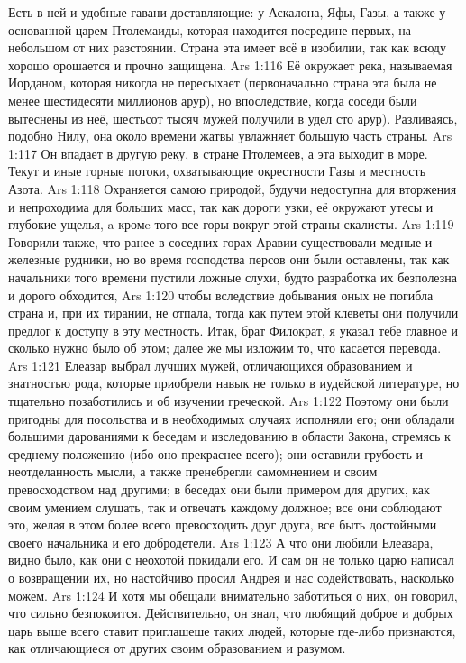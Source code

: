 Есть в ней и удобные гавани доставляющие: у Аскалона, Яфы, Газы, а также у основанной царем Птолемаиды, которая находится посредине первых, на небольшом от них разстоянии. Страна эта имеет всё в изобилии, так как всюду хорошо орошается и прочно защищена.
\vs Ars 1:116
Её окружает река, называемая Иорданом, которая никогда не пересыхает (первоначально страна эта была не менее шестидесяти миллионов арур), но впоследствие, когда соседи были вытеснены из неё, шестьсот тысяч мужей получили в удел сто арур). Разливаясь, подобно Нилу, она около времени жатвы увлажняет большую часть страны.
\vs Ars 1:117
Он впадает в другую реку, в стране Птолемеев, а эта выходит в море. Текут и иные горные потоки, охватывающие окрестности Газы и местность Азота.
\vs Ars 1:118
Охраняется самою природой, будучи недоступна для вторжения и непроходима для больших масс, так как дороги узки, её окружают утесы и глубокие ущелья, a кромe того все горы вокруг этой страны скалисты.
\vs Ars 1:119
Говорили также, что ранее в соседних горах Аравии существовали медные и железные рудники, но во время господства персов они были оставлены, так как начальники того времени пустили ложные слухи, будто разработка их безполезна и дорого обходится,
\vs Ars 1:120
чтобы вследствие добывания оных не погибла страна и, при их тирании, не отпала, тогда как путем этой клеветы они получили предлог к доступу в эту местность. Итак, брат Филократ, я указал тебе главное и сколько нужно было об этом; далее же мы изложим то, что касается перевода.
\vs Ars 1:121
Елеазар выбрал лучших мужей, отличающихся образованием и знатностью рода, которые приобрели навык не только в иудейской литературе, но тщательно позаботились и об изучении греческой.
\vs Ars 1:122
Поэтому они были пригодны для посольства и в необходимых случаях исполняли его; они обладали большими дарованиями к беседам и изследованию в области Закона, стремясь к среднему положению (ибо оно прекраснее всего); они оставили грубость и неотделанность мысли, а также пренебрегли самомнением и своим превосходством над другими; в беседах они были примером для других, как своим умением слушать, так и отвечать каждому должное; все они соблюдают это, желая в этом более всего превосходить друг друга, все быть достойными своего начальника и его добродетели.
\vs Ars 1:123
А что они любили Елеазара, видно было, как они с неохотой покидали его. И сам он не только царю написал о возвращении их, но настойчиво просил Андрея и нас содействовать, насколько можем.
\vs Ars 1:124
И хотя мы обещали внимательно заботиться о них, он говорил, что сильно безпокоится. Действительно, он знал, что любящий доброе и добрых царь выше всего ставит приглашеше таких людей, которые где-либо признаются, как отличающиеся от других своим образованием и разумом.
